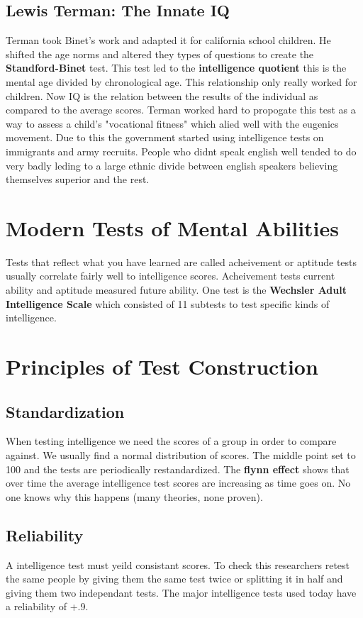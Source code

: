 \documentclass[12pt]{article}
\begin{document}
\subsection*{Lewis Terman: The Innate IQ}
Terman took Binet's work and adapted it for california school children. He shifted the age norms and altered they types of questions to create the \textbf{Standford-Binet} test. This test led to the \textbf{intelligence quotient} this is the mental age divided by chronological age. This relationship only really worked for children. Now IQ is the relation between the results of the individual as compared to the average scores. Terman worked hard to propogate this test as a way to assess a child's "vocational fitness" which alied well with the eugenics movement. Due to this the government started using intelligence tests on immigrants and army recruits. People who didnt speak english well tended to do very badly leding to a large ethnic divide between english speakers believing themselves superior and the rest. 
\section*{Modern Tests of Mental Abilities}
Tests that reflect what you have learned are called acheivement or aptitude tests usually correlate fairly well to intelligence scores. Acheivement tests current ability and aptitude measured future ability. One test is the \textbf{Wechsler Adult Intelligence Scale} which consisted of 11 subtests to test specific kinds of intelligence. 
\section*{Principles of Test Construction}
\subsection*{Standardization}
When testing intelligence we need the scores of a group in order to compare against. We usually find a normal distribution of scores. The middle point set to 100 and the tests are periodically restandardized. The \textbf{flynn effect} shows that over time the average intelligence test scores are increasing as time goes on. No one knows why this happens (many theories, none proven). 
\subsection*{Reliability}
A intelligence test must yeild consistant scores. To check this researchers retest the same people by  giving them the same test twice or splitting it in half and giving them two independant tests. The major intelligence tests used today have a reliability of +.9.
\end{document}
